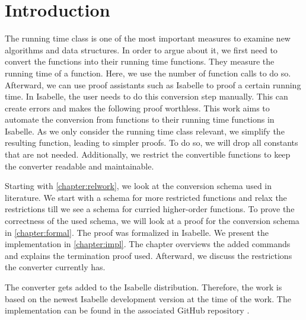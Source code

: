 \chapter{Introduction}\label{chapter:introduction}

The running time class is one of the most important measures to examine new algorithms and data structures.
In order to argue about it, we first need to convert the functions into their running time functions.
They measure the running time of a function.
Here, we use the number of function calls to do so.
Afterward, we can use proof assistants such as Isabelle to proof a certain running time.
In Isabelle, the user needs to do this conversion step manually.
This can create errors and makes the following proof worthless.
This work aims to automate the conversion from functions to their running time functions in Isabelle.
As we only consider the running time class relevant, we simplify the resulting function, leading to simpler proofs.
To do so, we will drop all constants that are not needed.
Additionally, we restrict the convertible functions to keep the converter readable and maintainable.

Starting with \autoref{chapter:relwork}, we look at the conversion schema used in literature.
We start with a schema for more restricted functions and relax the restrictions till we see a schema for curried higher-order functions.
To prove the correctness of the used schema, we will look at a proof for the conversion schema in \autoref{chapter:formal}.
The proof was formalized in Isabelle.
We present the implementation in \autoref{chapter:impl}.
The chapter overviews the added commands and explains the termination proof used.
Afterward, we discuss the restrictions the converter currently has.

The converter gets added to the Isabelle distribution.
Therefore, the work is based on the newest Isabelle development version at the time of the work.
The implementation can be found in the associated GitHub repository \cite{repo}.
